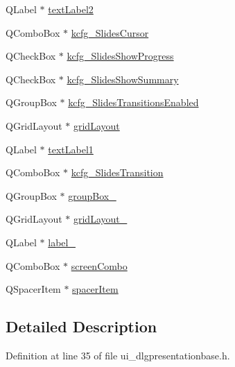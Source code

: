 \begin{DoxyCompactItemize}
Q\+Label $\ast$ \hyperlink{classUi__DlgPresentationBase_acbcb684cbb6019f342e3915f13e88dd7}{text\+Label2}
\item 
Q\+Combo\+Box $\ast$ \hyperlink{classUi__DlgPresentationBase_a63fb3704d0688c48101de850dc997a52}{kcfg\+\_\+\+Slides\+Cursor}
\item 
Q\+Check\+Box $\ast$ \hyperlink{classUi__DlgPresentationBase_a49775134ab9e76d0159e100bbe9f7cc3}{kcfg\+\_\+\+Slides\+Show\+Progress}
\item 
Q\+Check\+Box $\ast$ \hyperlink{classUi__DlgPresentationBase_aaa52dec18529c711c073a72fa10ac18e}{kcfg\+\_\+\+Slides\+Show\+Summary}
\item 
Q\+Group\+Box $\ast$ \hyperlink{classUi__DlgPresentationBase_a489f5852bca9a8fa374373464e6471c5}{kcfg\+\_\+\+Slides\+Transitions\+Enabled}
\item 
Q\+Grid\+Layout $\ast$ \hyperlink{classUi__DlgPresentationBase_a74c4ca17d50a0795a123c7704a3ff96f}{grid\+Layout}
\item 
Q\+Label $\ast$ \hyperlink{classUi__DlgPresentationBase_a378f091644c96cc7d40ea73433402362}{text\+Label1}
\item 
Q\+Combo\+Box $\ast$ \hyperlink{classUi__DlgPresentationBase_a125d8ff275f99a6c635d6ed80a7863eb}{kcfg\+\_\+\+Slides\+Transition}
\item 
Q\+Group\+Box $\ast$ \hyperlink{classUi__DlgPresentationBase_a73af927030719bc78930ff5a07ceb5e5}{group\+Box\+\_}
\item 
Q\+Grid\+Layout $\ast$ \hyperlink{classUi__DlgPresentationBase_afd1124df0a1ac1b6546fa5357a44c8fd}{grid\+Layout\+\_}
\item 
Q\+Label $\ast$ \hyperlink{classUi__DlgPresentationBase_a7a25c76fb858e7c2bf5626fe8d46414c}{label\+\_}
\item 
Q\+Combo\+Box $\ast$ \hyperlink{classUi__DlgPresentationBase_a588ed0d2c3045e6179c739bdf354e812}{screen\+Combo}
\item 
Q\+Spacer\+Item $\ast$ \hyperlink{classUi__DlgPresentationBase_aa08144be96f8def7a8157c4c5c4b4b09}{spacer\+Item}
\end{DoxyCompactItemize}


\subsection{Detailed Description}


Definition at line 35 of file ui\+\_\+dlgpresentationbase.\+h.



